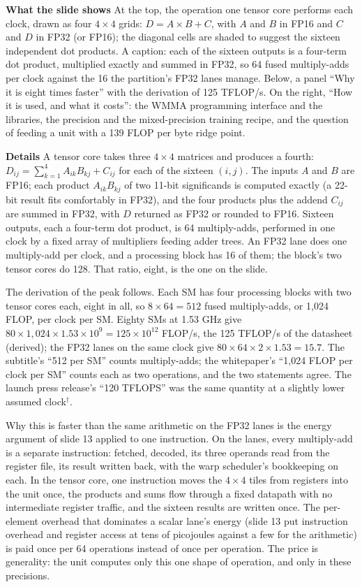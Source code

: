 \documentclass[11pt,letterpaper]{article}
\newcommand{\para}[1]{\medskip\noindent\textbf{#1}\quad}
\begin{document}
\para{What the slide shows} At the top, the operation one tensor core performs each clock, drawn as four $4\times4$ grids: $D = A \times B + C$, with $A$ and $B$ in FP16 and $C$ and $D$ in FP32 (or FP16); the diagonal cells are shaded to suggest the sixteen independent dot products. A caption: each of the sixteen outputs is a four-term dot product, multiplied exactly and summed in FP32, so 64 fused multiply-adds per clock against the 16 the partition's FP32 lanes manage. Below, a panel ``Why it is eight times faster'' with the derivation of 125 TFLOP/s. On the right, ``How it is used, and what it costs'': the WMMA programming interface and the libraries, the precision and the mixed-precision training recipe, and the question of feeding a unit with a 139 FLOP per byte ridge point.

\para{Details} A tensor core takes three $4\times4$ matrices and produces a fourth: $D_{ij} = \sum_{k=1}^{4} A_{ik} B_{kj} + C_{ij}$ for each of the sixteen $(i,j)$. The inputs $A$ and $B$ are FP16; each product $A_{ik} B_{kj}$ of two 11-bit significands is computed exactly (a 22-bit result fits comfortably in FP32), and the four products plus the addend $C_{ij}$ are summed in FP32, with $D$ returned as FP32 or rounded to FP16. Sixteen outputs, each a four-term dot product, is 64 multiply-adds, performed in one clock by a fixed array of multipliers feeding adder trees. An FP32 lane does one multiply-add per clock, and a processing block has 16 of them; the block's two tensor cores do 128. That ratio, eight, is the one on the slide.

The derivation of the peak follows. Each SM has four processing blocks with two tensor cores each, eight in all, so $8 \times 64 = 512$ fused multiply-adds, or 1,024 FLOP, per clock per SM. Eighty SMs at 1.53 GHz give $80 \times 1{,}024 \times 1.53 \times 10^9 = 125 \times 10^{12}$ FLOP/s, the 125 TFLOP/s of the datasheet (derived); the FP32 lanes on the same clock give $80\times64\times2\times1.53 = 15.7$. The subtitle's ``512 per SM'' counts multiply-adds; the whitepaper's ``1,024 FLOP per clock per SM'' counts each as two operations, and the two statements agree. The launch press release's ``120 TFLOPS'' was the same quantity at a slightly lower assumed clock$^\dagger$.

Why this is faster than the same arithmetic on the FP32 lanes is the energy argument of slide 13 applied to one instruction. On the lanes, every multiply-add is a separate instruction: fetched, decoded, its three operands read from the register file, its result written back, with the warp scheduler's bookkeeping on each. In the tensor core, one instruction moves the $4\times4$ tiles from registers into the unit once, the products and sums flow through a fixed datapath with no intermediate register traffic, and the sixteen results are written once. The per-element overhead that dominates a scalar lane's energy (slide 13 put instruction overhead and register access at tens of picojoules against a few for the arithmetic) is paid once per 64 operations instead of once per operation. The price is generality: the unit computes only this one shape of operation, and only in these precisions.
\end{document}
